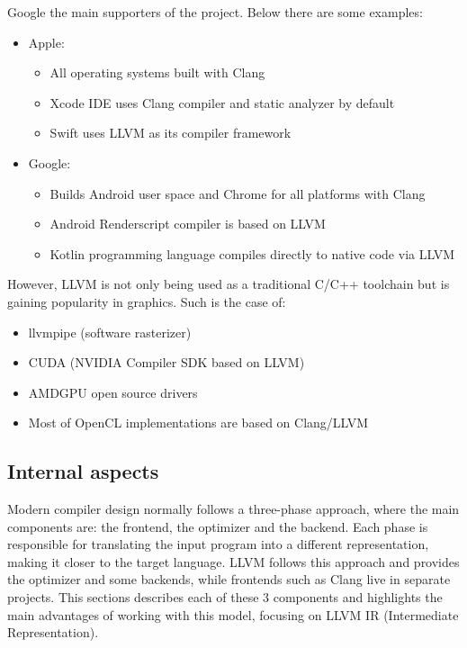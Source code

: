 \documentclass[12pt,a4paper,oneside]{article}
\begin{document}
Google the main supporters of the project. Below there are some examples:
\begin{itemize}
  \item Apple:
  \begin{itemize}
    \item All operating systems built with Clang
    \item Xcode IDE uses Clang compiler and static analyzer by default
    \item Swift uses LLVM as its compiler framework
  \end{itemize}
  \item Google:
  \begin{itemize}
    \item Builds Android user space and Chrome for all platforms with Clang
    \item Android Renderscript compiler is based on LLVM
    \item Kotlin programming language compiles directly to native code via LLVM
  \end{itemize}
\end{itemize}

However, LLVM is not only being used as a traditional C/C++ toolchain but is
gaining popularity in graphics. Such is the case of:
\begin{itemize}
  \item llvmpipe (software rasterizer)
  \item CUDA (NVIDIA Compiler SDK based on LLVM)
  \item AMDGPU open source drivers
  \item Most of OpenCL implementations are based on Clang/LLVM
\end{itemize}

\subsection{Internal aspects}

Modern compiler design normally follows a three-phase approach, where the main
components are: the frontend, the optimizer and the backend. Each phase is
responsible for translating the input program into a different representation,
making it closer to the target language. LLVM follows this approach and provides
the optimizer and some backends, while frontends such as Clang live in separate
projects. This sections describes each of these 3 components and highlights the
main advantages of working with this model, focusing on LLVM IR (Intermediate
Representation).
\end{document}
